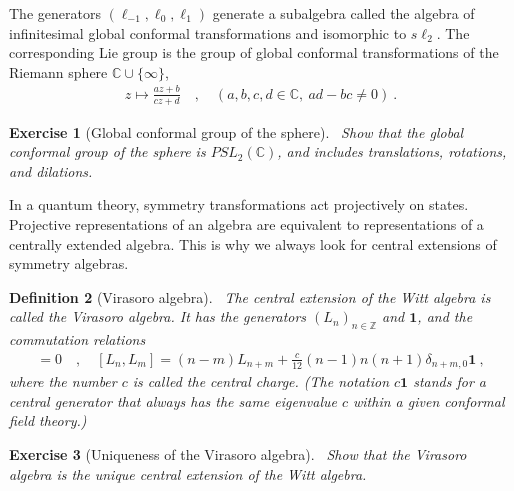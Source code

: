 \documentclass[12pt, a4paper]{article}
\theoremstyle{break}
\newtheorem{exo}{Exercise}[section]
\newtheorem{defn}[exo]{Definition}
\begin{document}
The generators $(\ell_{-1},\ell_0,\ell_1)$ generate a subalgebra called the algebra of infinitesimal global conformal transformations and isomorphic to $s\ell_2$.  The corresponding Lie group is the group of global conformal transformations of 
the Riemann sphere $\mathbb{C}\cup \{\infty\}$,
\begin{align}
 z \mapsto \frac{az+b}{cz+d}\quad , \quad (a,b,c,d\in \mathbb{C},\ ad-bc\neq 0)\ .
\end{align}


\begin{exo}[Global conformal group of the sphere]
 ~\label{exo:sphere}
Show that the global conformal group of the sphere is $PSL_2(\mathbb{C})$, and includes translations, rotations, and dilations. 
\end{exo}

In a quantum theory, symmetry transformations act projectively on states. 
Projective representations of an algebra are equivalent to representations of a centrally extended algebra. 
This is why we always look for central extensions of symmetry algebras.

\begin{defn}[Virasoro algebra]
 ~\label{def:vir}
 The central extension of the Witt algebra is called the Virasoro algebra. It has the generators $(L_n)_{n\in\mathbb{Z}}$ and $\mathbf 1$, and the commutation relations
 \begin{align}
  [\mathbf 1, L_n] = 0 \quad , \quad [L_n,L_m] = (n-m)L_{n+m} +\frac{c}{12}(n-1)n(n+1)\delta_{n+m,0}\mathbf 1 \ ,
  \label{eq:vir}
 \end{align}
 where the number $c$ is called the central charge. (The notation $c\mathbf 1$ stands for a central generator that always has the same eigenvalue $c$ within a given conformal field theory.)
\end{defn}

\begin{exo}[Uniqueness of the Virasoro algebra]
 ~\label{exo:vir}
 Show that the Virasoro algebra is the unique central extension of the Witt algebra.
\end{exo}
\end{document}
